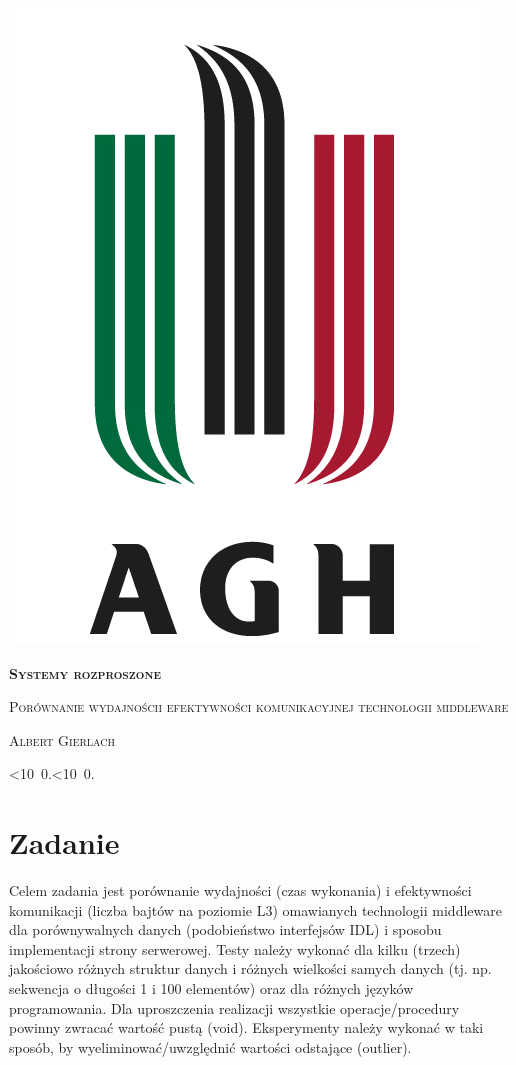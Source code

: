 \documentclass[12pt]{article}
\def\mydate{\leavevmode\hbox{\twodigits\day.\twodigits\month.\the\year}}
\def\twodigits#1{\ifnum#1<10 0\fi\the#1}
\begin{document}
\thispagestyle{empty}
\begin{center}
\begin{minipage}{0.75\linewidth}
    \centering
    \includegraphics[width=0.45\linewidth]{agh_logo2.png}
    \par
    \vspace{2cm}
    {\bfseries{\scshape{\Huge Systemy rozproszone}}}
    \par
    \vspace{1.7cm}
    {\scshape{\Large Porównanie wydajności\linebreak i efektywności komunikacyjnej technologii middleware}}
    \par
    \vspace{3.8cm}

    {\scshape{\Large Albert Gierlach}}\par
    \vspace{1cm}

    {\Large \mydate}
\end{minipage}
\end{center}
\clearpage



\section{Zadanie}
Celem zadania jest porównanie wydajności (czas wykonania) i efektywności komunikacji (liczba bajtów na poziomie L3) omawianych technologii middleware dla porównywalnych danych (podobieństwo interfejsów IDL) i sposobu implementacji strony serwerowej. Testy należy wykonać dla kilku (trzech) jakościowo różnych struktur danych i różnych wielkości samych danych (tj. np. sekwencja o długości 1 i 100 elementów) oraz dla różnych języków programowania. Dla uproszczenia realizacji wszystkie operacje/procedury powinny zwracać wartość pustą (void). Eksperymenty należy wykonać w taki sposób, by wyeliminować/uwzględnić wartości odstające (outlier).
\end{document}
